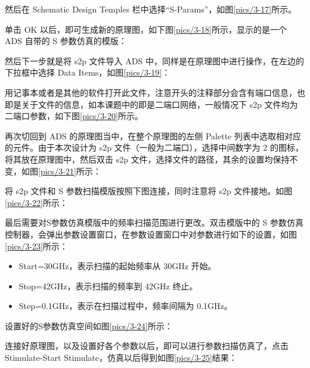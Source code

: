 然后在 Schematic Design Temples 栏中选择“S-Params”，如图\ref{pics/3-17}所示。

单击 OK 以后，即可生成新的原理图，如下图\ref{pics/3-18}所示，显示的是一个 ADS 自带的 S 参数仿真的模版：

然后下一步就是将 s2p 文件导入 ADS 中，同样是在原理图中进行操作，在左边的下拉框中选择 Data Items，如图\ref{pics/3-19}：

用记事本或者是其他的软件打开此文件，注意开头的注释部分会含有端口信息，也即是关于文件的信息，如本课题中的即是二端口网络，一般情况下 s2p 文件均为二端口参数，如下图\ref{pics/3-20}所示。

再次切回到 ADS 的原理图当中，在整个原理图的左侧 Palette 列表中选取相对应的元件。由于本次设计为 s2p 文件（一般为二端口），选择中间数字为 2 的图标，将其放在原理图中，然后双击 s2p 文件，选择文件的路径，其余的设置均保持不变，如图\ref{pics/3-21}所示：

将 s2p 文件和 S 参数扫描模版按照下图连接，同时注意将 s2p 文件接地。如图\ref{pics/3-22}所示：

最后需要对S参数仿真模版中的频率扫描范围进行更改。双击模版中的 S 参数仿真控制器，会弹出参数设置窗口，在参数设置窗口中对参数进行如下的设置，如图\ref{pics/3-23}所示：
\begin{itemize}
	\item Start=30GHz，表示扫描的起始频率从 30GHz 开始。
	\item Stop=42GHz，表示扫描的频率到 42GHz 终止。
	\item Step=0.1GHz，表示在扫描过程中，频率间隔为 0.1GHz。
\end{itemize}

设置好的S参数仿真空间如图\ref{pics/3-24}所示：

连接好原理图，以及设置好各个参数以后，即可以进行参数扫描仿真了，点击 Stimulate-Start Stimulate，仿真以后得到如图\ref{pics/3-25}结果：



